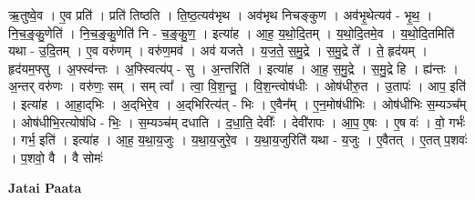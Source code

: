 \documentclass[17pt]{extarticle}
\begin{document}
ऋ॒तुष्वे॒व । ए॒व प्रति॑ । प्रति॑ तिष्ठति । ति॒ष्ठ॒त्यव॑भृथ । अव॑भृथ निचङ्कुण । अव॑भृ॒थेत्यव॑ - भृ॒थ॒ । नि॒च॒ङ्‍॒कु॒णेति॑ । नि॒च॒ङ्‍॒कु॒णेति॑ नि - च॒ङ्‍॒कु॒ण॒ । इत्या॑ह । आ॒ह॒ य॒थो॒दि॒तम् । य॒थो॒दि॒तमे॒व । य॒थो॒दि॒तमिति॑ यथा - उ॒दि॒तम् । ए॒व वरु॑णम् । वरु॑ण॒मव॑ । अव॑ यजते । य॒ज॒ते॒ स॒मु॒द्रे । स॒मु॒द्रे ते᳚ । ते॒ हृद॑यम् । हृद॑यम॒फ्सु । अ॒फ्स्व॑न्तः । अ॒फ्स्वित्य॑प् - सु । अ॒न्तरिति॑ । इत्या॑ह । आ॒ह॒ स॒मु॒द्रे । स॒मु॒द्रे हि । ह्य॑न्तः । अ॒न्तर् वरु॑णः । वरु॑णः॒ सम् । सम् त्वा᳚ । त्वा॒ वि॒श॒न्तु॒ । वि॒श॒न्त्वोष॑धीः । ओष॑धीरु॒त । उ॒तापः॑ । आप॒ इति॑ । इत्या॑ह । आ॒हा॒द्‌भिः । अ॒द्‌भिरे॒व । अ॒द्‌भिरित्य॑त् - भिः । ए॒वैन᳚म् । ए॒न॒मोष॑धीभिः । ओष॑धीभिः स॒म्यञ्च᳚म् । ओष॑धीभि॒रत्योष॑धि - भिः॒ । स॒म्यञ्च॑म् दधाति । द॒धा॒ति॒ देवीः᳚ । देवी॑रापः । आ॒प॒ ए॒षः । ए॒ष वः॑ । वो॒ गर्भः॑ । गर्भ॒ इति॑ । इत्या॑ह । आ॒ह॒ य॒था॒य॒जुः । य॒था॒य॒जुरे॒व । य॒था॒य॒जुरिति॑ यथा - य॒जुः । ए॒वैतत् । ए॒तत् प॒शवः॑ । प॒शवो॒ वै । वै सोमः॑ \newline

\textbf{Jatai Paata} \newline
\end{document}
